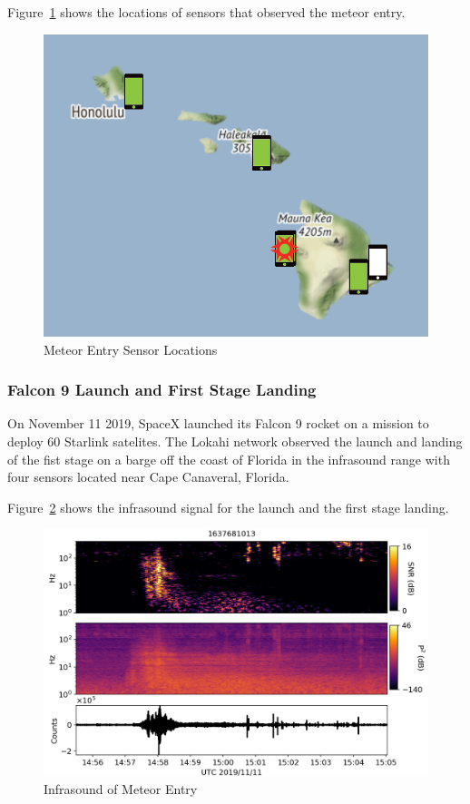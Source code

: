 Figure~\ref{fig:meteor_2} shows the locations of sensors that observed the meteor entry.

\begin{figure}[H]
    \centering
    \includegraphics[width=.75\linewidth]{figures/meteor_2.png}
    \caption{Meteor Entry Sensor Locations}
    \label{fig:meteor_2}
\end{figure}

\subsubsection{Falcon 9 Launch and First Stage Landing}

On November 11 2019, SpaceX launched its Falcon 9 rocket on a mission to deploy 60 Starlink satelites\cite{spacex}. The Lokahi network observed the launch and landing of the fist stage on a barge off the coast of Florida in the infrasound range with four sensors located near Cape Canaveral, Florida.

Figure~\ref{fig:spacex_1} shows the infrasound signal for the launch and the first stage landing.

\begin{figure}[H]
    \centering
    \includegraphics[width=\linewidth]{figures/spacex_1.png}
    \caption{Infrasound of Meteor Entry}
    \label{fig:spacex_1}
\end{figure}

